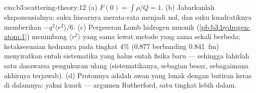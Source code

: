 \begin{solution}{exo:b3:scattering-theory:12}
(a) $F(0) = \int\rho/Q = 1$. (b) Jabarkanlah eksponensialnya; suku
linearnya merata-rata menjadi nol, dan suku kuadratiknya memberikan
$-q^2\langle r^2\rangle/6$. (c) Pergeseran Lamb hidrogen muonik
(\cref{pb:b3:hydrogen-atom:1}) menimbang $\langle r^2\rangle$ yang sama
lewat metode yang sama sekali berbeda; ketaksesuaian keduanya pada
tingkat $4\%$ (0.877 berbanding \qty{0.841}{fm})
menyiratkan entah sistematika yang halus entah fisika baru --- sehingga
lahirlah satu dasawarsa pengukuran ulang (sistematikanya, sebagian
besar, sebagaimana akhirnya terjawab).
(d) Protonnya adalah awan yang lunak dengan butiran keras di dalamnya:
yakni kuark --- argumen Rutherford, satu tingkat lebih dalam.
\end{solution}

